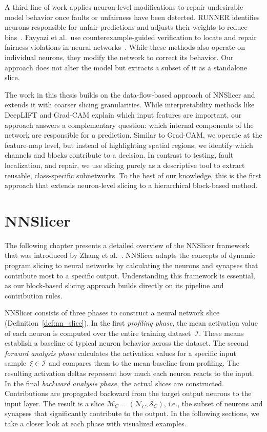 \documentclass[
12pt,
fancyheadings,
a4paper,
twoside,
BCOR=0.7cm,
nobcorignoretitle,
grayscalebody,
]{stsreprt}
\begin{document}
A third line of work applies neuron-level modifications to repair undesirable model behavior once
faults or unfairness have been detected.
RUNNER identifies neurons responsible for unfair predictions and adjusts their weights to reduce
bias~\cite{li2024runner}.
Fayyazi et al.\ use counterexample-guided verification to locate and repair fairness violations in
neural networks~\cite{ijcai2025p42}.
While these methods also operate on individual neurons, they modify the network to correct its
behavior.
Our approach does not alter the model but extracts a subset of it as a standalone slice.


\vspace{0.2cm}

The work in this thesis builds on the data-flow-based approach of NNSlicer and extends it with
coarser slicing granularities.
While interpretability methods like DeepLIFT and Grad-CAM explain which input features are
important, our approach answers a complementary question: which internal components of the network
are responsible for a prediction.
Similar to Grad-CAM, we operate at the feature-map level, but instead of highlighting spatial
regions, we identify which channels and blocks contribute to a decision.
In contrast to testing, fault localization, and repair, we use slicing purely as a descriptive tool
to extract reusable, class-specific subnetworks.
To the best of our knowledge, this is the first approach that extends neuron-level slicing to a
hierarchical block-based method.



\chapter{NNSlicer}
\label{ch:nnslicer}

The following chapter presents a detailed overview of the NNSlicer framework that was introduced by
Zhang et al.~\cite{zhang2020dynamic}.
NNSlicer adapts the concepts of dynamic program slicing to neural networks by calculating the
neurons and synapses that contribute most to a specific output.
Understanding this framework is essential, as our block-based slicing approach builds directly on
its pipeline and contribution rules.

NNSlicer consists of three phases to construct a neural network slice
(Definition~\ref{def:nn_slice}).
In the first \textit{profiling phase}, the mean activation value of each neuron is computed over
the entire training dataset~$\mathcal{I}$.
These means establish a baseline of typical neuron behavior across the dataset.
The second \textit{forward analysis phase} calculates the activation values for a specific input
sample~$\xi \in \mathcal{I}$ and compares them to the mean baseline from profiling.
The resulting activation deltas represent how much each neuron reacts to the input.
In the final \textit{backward analysis phase}, the actual slices are constructed.
Contributions are propagated backward from the target output neurons to the input layer.
The result is a slice $\mathcal{M}_C = (\mathcal{N}_C, \mathcal{S}_C)$, i.e., the subset of neurons
and synapses that significantly contribute to the output.
In the following sections, we take a closer look at each phase with visualized examples.
\end{document}
